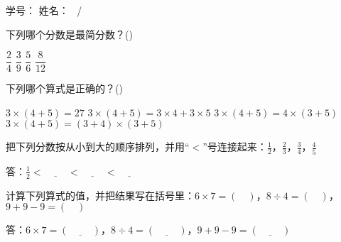 \documentclass{ksexam}
\begin{document}
{学号：\underline{\hspace*{8em}}}
{姓名：\underline{\hspace*{8em}}}
{\thepage{}\ /\ \numpages{}}

\begin{center}
    \cellwidth{0.8em}
    \gradetable[h][questions]
\end{center}

\begin{questions}


    \question[10] 下列哪个分数是最简分数？(\hspace*{2em})

    \begin{oneparchoices}
        \choice $\dfrac{2}{4}$
        \choice $\dfrac{3}{9}$
        \CorrectChoice $\dfrac{5}{6}$
        \choice $\dfrac{8}{12}$
    \end{oneparchoices}

    \question[10] 下列哪个算式是正确的？(\hspace*{2em})

    \begin{choices}
        \choice $3 \times (4 + 5) = 27$
        \CorrectChoice $3 \times (4 + 5) = 3 \times 4 + 3 \times 5$
        \choice $3 \times (4 + 5) = 4 \times (3 + 5)$
        \choice $3 \times (4 + 5) = (3 + 4) \times (3 + 5)$
    \end{choices}


    \question[8] 把下列分数按从小到大的顺序排列，并用“$<$”号连接起来：$\frac{1}{2}$，$\frac{2}{3}$，$\frac{3}{4}$，$\frac{4}{5}$

    答：$\frac{1}{2} < \underline{\hspace{1cm}} < \underline{\hspace{1cm}} < \underline{\hspace{1cm}}$

    \question[8] 计算下列算式的值，并把结果写在括号里：$6 \times 7 = (\quad)$，$8 \div 4 = (\quad)$，$9 + 9 - 9 = (\quad)$

    答：$6 \times 7 = (\underline{\hspace{1cm}})$，$8 \div 4 = (\underline{\hspace{1cm}})$，$9 + 9 - 9 = (\underline{\hspace{1cm}})$


\end{questions}
\end{document}
